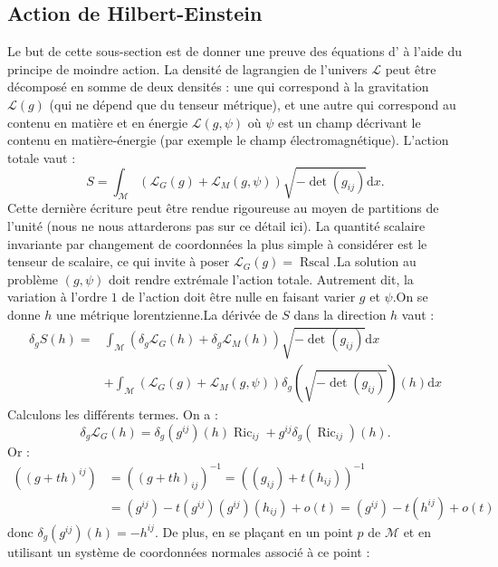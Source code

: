 \documentclass[12pt,a4paper]{article}
\DeclareMathOperator{\Ric}{Ric}
\DeclareMathOperator{\Rscal}{Rscal}
\theoremstyle{definition}
\begin{document}
\subsection{Action de Hilbert-Einstein}
Le but de cette sous-section est de donner une preuve des équations d' à l'aide du principe de moindre action.\newline
La densité de lagrangien de l'univers $\mathcal{L}$ peut être décomposé en somme de deux densités : une qui correspond à la gravitation $\mathcal{L}(g)$ (qui ne dépend que du tenseur métrique), et une autre qui correspond au contenu en matière et en énergie $\mathcal{L}(g,\psi)$ où $\psi$ est un champ décrivant le contenu en matière-énergie (par exemple le champ électromagnétique). L'action totale vaut :
$$S=\int_{\mathcal{M}}\left(\mathcal{L}_G(g)+\mathcal{L}_M(g,\psi)\right)\sqrt{-\det(g_{ij})}\mathrm{d}x.$$
Cette dernière écriture peut être rendue rigoureuse au moyen de partitions de l'unité (nous ne nous attarderons pas sur ce détail ici).\newline
La quantité scalaire invariante par changement de coordonnées la plus simple à considérer est le tenseur de  scalaire, ce qui invite à poser $\mathcal{L}_G(g)=\Rscal$.\newline La solution au problème $(g,\psi)$ doit rendre extrémale l'action totale. Autrement dit, la variation à l'ordre $1$ de l'action doit être nulle en faisant varier $g$ et $\psi$.\newline On se donne $h$ une métrique lorentzienne.\newline La dérivée de $S$ dans la direction $h$ vaut :
\begin{align*}
\delta_gS(h)=&\int_\mathcal{M}\left(\delta_g\mathcal{L}_G(h)+\delta_g\mathcal{L}_M(h)\right)\sqrt{-\det(g_{ij})}\mathrm{d}x\\&+\int_\mathcal{M}\left(\mathcal{L}_G(g)+\mathcal{L}_M(g,\psi)\right)\delta_g\left(\sqrt{-\det(g_{ij})}\right)(h)\mathrm{d}x
\end{align*}
Calculons les différents termes. On a :
$$
\delta_g\mathcal{L}_G(h)=\delta_g\left(g^{ij}\right)(h)\Ric_{ij}+g^{ij}\delta_g(\Ric_{ij})(h).
$$
Or :
\begin{align*}
\left((g+th)^{ij}\right)&=((g+th)_{ij})^{-1}=((g_{ij})+t(h_{ij}))^{-1}\\&=(g^{ij})-t(g^{ij})(g^{ij})(h_{ij})+o(t)=(g^{ij})-t(h^{ij})+o(t)
\end{align*}
donc $\delta_g\left(g^{ij}\right)(h)=-h^{ij}$.
De plus, en se plaçant en un point $p$ de $\mathcal{M}$ et en utilisant un système de coordonnées normales associé à ce point :
\end{document}
